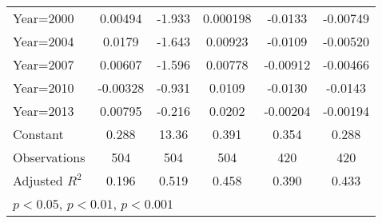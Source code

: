 \begin{table}[htbp]
\begin{tabular}{l*{5}{c}}
Year=2000           &     0.00494         &      -1.933\sym{***}&    0.000198         &     -0.0133\sym{*}  &    -0.00749         \\
Year=2004           &      0.0179         &      -1.643\sym{**} &     0.00923         &     -0.0109         &    -0.00520         \\
Year=2007           &     0.00607         &      -1.596\sym{**} &     0.00778         &    -0.00912         &    -0.00466         \\
Year=2010           &    -0.00328         &      -0.931         &      0.0109         &     -0.0130         &     -0.0143         \\
Year=2013           &     0.00795         &      -0.216         &      0.0202\sym{**} &    -0.00204         &    -0.00194         \\
Constant            &       0.288\sym{***}&       13.36\sym{***}&       0.391\sym{***}&       0.354\sym{***}&       0.288\sym{***}\\
\hline
Observations        &         504         &         504         &         504         &         420         &         420         \\
Adjusted \(R^{2}\)  &       0.196         &       0.519         &       0.458         &       0.390         &       0.433         \\
\hline\hline
\multicolumn{6}{l}{\footnotesize \sym{*} \(p<0.05\), \sym{**} \(p<0.01\), \sym{***} \(p<0.001\)}\\
\end{tabular}
\end{table}

